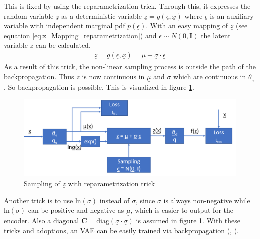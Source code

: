 \documentclass[12pt,DIV14,BCOR12mm,a4paper,footexclude,headinclude,halfparskip-,twoside,openright,cleardoubleempty,idxtotoc,bibtotoc,listtotoc,abstracton]{scrreprt} %
\numberwithin{equation}{chapter}
\begin{document}
This is fixed by using the reparametrization trick. Through this, it expresses the random variable $\underline{z}$ as a deterministic variable $\underline{z} = g(\underline{\epsilon}, \underline{x})$ where $\underline{\epsilon}$ is an auxiliary variable with independent marginal pdf $p(\underline{\epsilon})$. With an easy mapping of $\underline{z}$ (see equation \ref{eq:z_Mapping_reparametrization}) and $\underline{\epsilon} \backsim N(\underline{0}, \mathbf{I})$ the latent variable $\underline{z}$ can be calculated.
\begin{align}
	\underline{z} = g(\underline{\epsilon}, \underline{x}) = \underline{\mu} + \underline{\sigma}\cdot\underline{\epsilon}\label{eq:z_Mapping_reparametrization}
\end{align}
As a result of this trick, the non-linear sampling process is outside the path of the backpropagation. Thus $\underline{z}$ is now continuous in $\underline{\mu}$ and $\underline{\sigma}$ which are continuous in $\underline{\theta}_e$. So backpropagation is possible. This is visualized in figure \ref{fig:Sampling_w_reparametrization}.
\begin{figure}[htb!]
	\centering
	\includegraphics[width=0.75\linewidth]{Graphiken/VAE_w_reparametrization}
	\caption{Sampling of $\underline{z}$ with reparametrization trick}
	\label{fig:Sampling_w_reparametrization}
\end{figure}
Another trick is to use $\textrm{ln}(\underline{\sigma})$ instead of $\underline{\sigma}$, since $\underline{\sigma}$ is always non-negative while $\textrm{ln}(\underline{\sigma})$ can be positive and negative as $\underline{\mu}$, which is easier to output for the encoder. Also a diagonal $\mathbf{C} = \textrm{diag}(\underline{\sigma}\cdot\underline{\sigma})$ is assumed in figure \ref{fig:Sampling_w_reparametrization}. With these tricks and adoptions, an VAE can be easily trained via backpropagation (\cite{Kingma14VAE}, \cite{LectureNotes_DeepLearning}).
\end{document}
